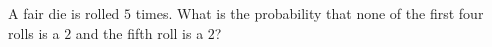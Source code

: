 A fair die is rolled $5$ times. What is the probability that none of the first four rolls is a $2$ and the fifth roll is a $2$?
